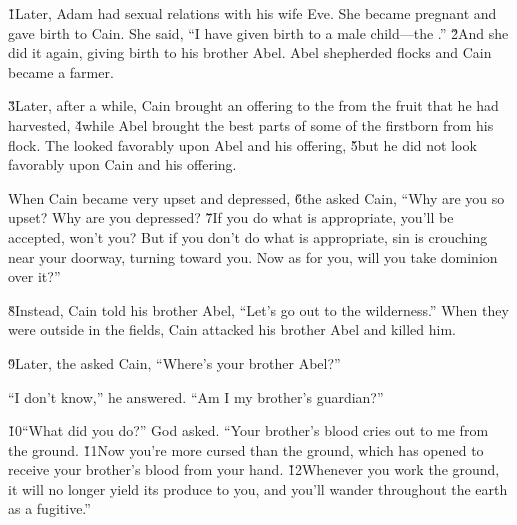 \v{1}Later, Adam had sexual relations with his wife Eve. She became pregnant and gave birth to Cain. She said, ``I have given birth to a male child---the .'' \v{2}And she did it again, giving birth to his brother Abel. Abel shepherded flocks and Cain became a farmer.

\v{3}Later, after a while, Cain brought an offering to the  from the fruit that he had harvested, \v{4}while Abel brought the best parts of some of the firstborn from his flock. The  looked favorably upon Abel and his offering, \v{5}but he did not look favorably upon Cain and his offering.

When Cain became very upset and depressed, \v{6}the  asked Cain, ``Why are you so upset? Why are you depressed? \v{7}If you do what is appropriate, you'll be accepted, won't you? But if you don't do what is appropriate, sin is crouching near your doorway, turning toward you. Now as for you, will you take dominion over it?''

\v{8}Instead, Cain told his brother Abel, ``Let's go out to the wilderness.'' When they were outside in the fields, Cain attacked his brother Abel and killed him.

\v{9}Later, the  asked Cain, ``Where's your brother Abel?''

``I don't know,'' he answered. ``Am I my brother's guardian?''

\v{10}``What did you do?'' God asked. ``Your brother's blood cries out to me from the ground. \v{11}Now you're more cursed than the ground, which has opened to receive your brother's blood from your hand. \v{12}Whenever you work the ground, it will no longer yield its produce to you, and you'll wander throughout the earth as a fugitive.''

